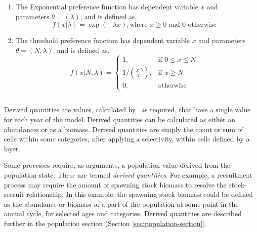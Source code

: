\begin{enumerate}
\item The Exponential preference function has dependent variable $x$ and parameters $\theta = (\lambda)$, and is defined as,
\begin{equation}
  f(x | \lambda) =\exp(-\lambda x), \text{where $x \geq 0$ and $0$ otherwise}
\end{equation}

\item The threshold preference function has dependent variable $x$ and parameters $\theta = (N,\lambda)$, and is defined as,
\begin{equation}
  f(x | N, \lambda) = \begin{cases}
    1, & \text{if $0 \le x \leq N$} \\
    1/\left({\frac{x}{N}}^\lambda\right), & \text{if $x \ge N$}\\
    0, & \text{otherwise}
  \end{cases}
\end{equation}

\end{enumerate}

\subsection{\label{sec:derived-quantities}}

Derived quantities are values, calculated by \SPM\ as required, that have a single value for each year of the model. Derived quantities can be calculated as either an abundances or as a biomass. Derived quantities are simply the count or sum of cells within some categories, after applying a selectivity, within cells defined by a layer.

Some processes require, as arguments, a population value derived from the population state. These are termed \emph{derived quantities}. For example, a recruitment process may require the amount of spawning stock biomass to resolve the stock-recruit relationship. In this example, the spawning stock biomass could be defined as the abundance or biomass of a part of the population at some point in the annual cycle, for selected ages and categories. Derived quantities are described further in the population section (Section \ref{sec:population-section}).

\subsection{\label{sec:size-at-age}}

